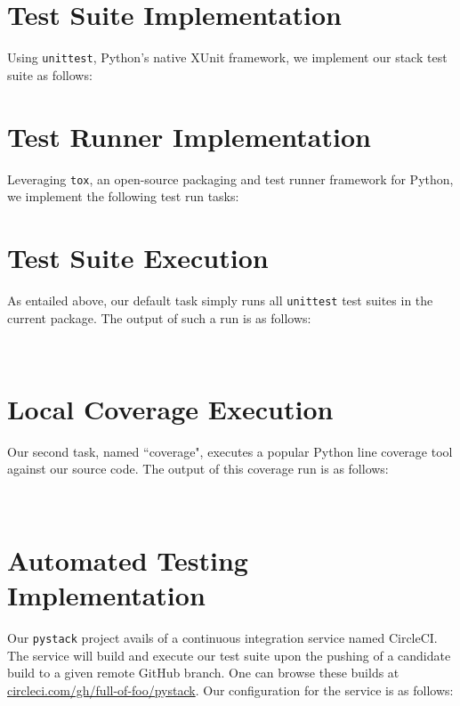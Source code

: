 \documentclass[a4paper, 11pt]{article}
\begin{document}
\section*{Test Suite Implementation}
Using \lstinline$unittest$, Python's native XUnit framework, we implement our stack test suite as follows:
\\


\section*{Test Runner Implementation}
Leveraging \lstinline$tox$, an open-source packaging and test runner framework for Python, we implement the following test run tasks:


\section*{Test Suite Execution}
\noindent As entailed above, our default task simply runs all \lstinline$unittest$ test suites in the current package. The output of such a run is as follows:

\\


\section*{Local Coverage Execution}
Our second task, named ``coverage", executes a popular Python line coverage tool against our source code. The output of this coverage run is as follows:

\\


\section*{Automated Testing Implementation}
Our \lstinline$pystack$ project avails of a continuous integration service named CircleCI. The service will build and execute our test suite upon the pushing of a candidate build to a given remote GitHub branch. One can browse 
these builds at \href{https://circleci.com/gh/full-of-foo/pystack}{circleci.com/gh/full-of-foo/pystack}. Our configuration for the service is as follows:
\\

\end{document}
